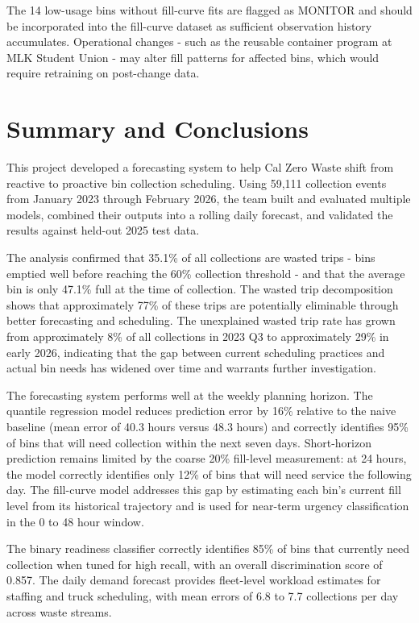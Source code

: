 \documentclass[11pt]{article}
\begin{document}
The 14 low-usage bins without fill-curve fits are flagged as MONITOR and should be
incorporated into the fill-curve dataset as sufficient observation history accumulates.
Operational changes - such as the reusable container program at MLK Student Union - may
alter fill patterns for affected bins, which would require retraining on post-change data.

\newpage

\section{Summary and Conclusions}

This project developed a forecasting system to help Cal Zero Waste shift from reactive
to proactive bin collection scheduling. Using 59,111 collection events from January 2023
through February 2026, the team built and evaluated multiple models, combined their
outputs into a rolling daily forecast, and validated the results against held-out 2025
test data.

The analysis confirmed that 35.1\% of all collections are wasted trips - bins emptied
well before reaching the 60\% collection threshold - and that the average bin is only
47.1\% full at the time of collection. The wasted trip decomposition shows that
approximately 77\% of these trips are potentially eliminable through better forecasting
and scheduling. The unexplained wasted trip rate has grown from approximately 8\% of all
collections in 2023 Q3 to approximately 29\% in early 2026, indicating that the gap
between current scheduling practices and actual bin needs has widened over time and
warrants further investigation.

The forecasting system performs well at the weekly planning horizon. The quantile
regression model reduces prediction error by 16\% relative to the naive baseline (mean
error of 40.3 hours versus 48.3 hours) and correctly identifies 95\% of bins that will
need collection within the next seven days. Short-horizon prediction remains limited by
the coarse 20\% fill-level measurement: at 24 hours, the model correctly identifies only
12\% of bins that will need service the following day. The fill-curve model addresses
this gap by estimating each bin's current fill level from its historical trajectory and
is used for near-term urgency classification in the 0 to 48 hour window.

The binary readiness classifier correctly identifies 85\% of bins that currently need
collection when tuned for high recall, with an overall discrimination score of 0.857.
The daily demand forecast provides fleet-level workload estimates for staffing and truck
scheduling, with mean errors of 6.8 to 7.7 collections per day across waste streams.
\end{document}
